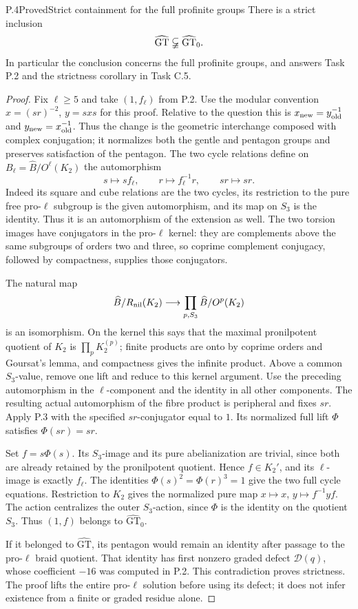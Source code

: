 \begin{statement}{P.4}{Proved}{Strict containment for the full profinite groups}
There is a strict inclusion
\[
                    \widehat{\mathrm{GT}}
                    \varsubsetneqq\widehat{\mathrm{GT}}_0.
\]
In particular the conclusion concerns the full profinite groups,
and answers Task P.2 and the strictness corollary in Task C.5.
\end{statement}
\begin{proof}
Fix $\ell\geq5$ and take $(1,f_\ell)$ from P.2. Use the modular
convention $x=(sr)^{-2}$, $y=sxs$ for this proof. Relative to the
question this is $x_{\rm new}=y_{\rm old}^{-1}$ and
$y_{\rm new}=x_{\rm old}^{-1}$. Thus the change is the geometric
interchange composed with complex conjugation; it normalizes both
the gentle and pentagon groups and preserves satisfaction of the pentagon.
The two cycle relations define on
$B_\ell=\widehat B/O^\ell(K_2)$ the automorphism
\[
 s\longmapsto sf_\ell,\qquad
 r\longmapsto f_\ell^{-1}r,\qquad sr\longmapsto sr.
\]
Indeed its square and cube relations are the two cycles,
its restriction to the pure free pro-$\ell$ subgroup is the
given automorphism, and its map on $S_3$ is the identity.
Thus it is an automorphism of the extension as well. The two
torsion images have conjugators in the pro-$\ell$ kernel:
they are complements above the same subgroups of orders two
and three, so coprime complement conjugacy, followed by
compactness, supplies those conjugators.

The natural map
\[
 \widehat B/R_{\rm nil}(K_2)
       \longrightarrow\prod_{p,S_3}\widehat B/O^p(K_2)
\]
is an isomorphism. On the kernel this says that the maximal
pronilpotent quotient of $K_2$ is $\prod_pK_2^{(p)}$;
finite products are onto by coprime orders and Goursat's lemma,
and compactness gives the infinite product. Above a common
$S_3$-value, remove one lift and reduce to this kernel argument.
Use the preceding automorphism in the $\ell$-component and
the identity in all other components. The resulting actual
automorphism of the fibre product is peripheral and fixes $sr$.
Apply P.3 with the specified $sr$-conjugator equal to $1$.
Its normalized full lift $\Phi$ satisfies $\Phi(sr)=sr$.

Set $f=s\Phi(s)$. Its $S_3$-image and its pure abelianization
are trivial, since both are already retained by the pronilpotent
quotient. Hence $f\in K_2'$, and its $\ell$-image is exactly
$f_\ell$. The identities $\Phi(s)^2=\Phi(r)^3=1$ give
the two full cycle equations. Restriction to $K_2$ gives the
normalized pure map $x\mapsto x$, $y\mapsto f^{-1}yf$.
The action centralizes the outer $S_3$-action, since $\Phi$
is the identity on the quotient $S_3$. Thus $(1,f)$ belongs
to $\widehat{\mathrm{GT}}_0$.

If it belonged to $\widehat{\mathrm{GT}}$, its pentagon would
remain an identity after passage to the pro-$\ell$ braid
quotient. That identity has first nonzero graded defect
$\mathcal D(q)$, whose coefficient $-16$ was computed in P.2.
This contradiction proves strictness. The proof lifts the
entire pro-$\ell$ solution before using its defect; it does
not infer existence from a finite or graded residue alone.
\end{proof}

